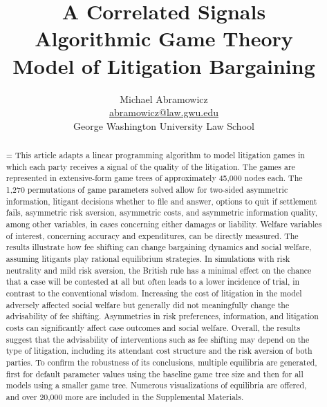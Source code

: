\documentclass{article}
\newenvironment{nohyphen}
  {\tolerance=1%
   \emergencystretch=\maxdimen%
   \hyphenpenalty=10000%
   \hbadness=10000}%
  {\par}%
\begin{document}
\title{A Correlated Signals \\ Algorithmic Game Theory \\ Model of Litigation Bargaining}
\author{Michael Abramowicz \\ \href{mailto:abramowicz@law.gwu.edu}{abramowicz@law.gwu.edu} \\ George Washington University Law School}

\maketitle

\begin{abstract}
\begin{nohyphen}
This article adapts a linear programming algorithm to model litigation games in which each party receives a signal of the quality of the litigation. The games are represented in extensive-form game trees of approximately 45,000 nodes each. The 1,270 permutations of game parameters solved allow for two-sided asymmetric information, litigant decisions whether to file and answer, options to quit if settlement fails, asymmetric risk aversion, asymmetric costs, and asymmetric information quality, among other variables, in cases concerning either damages or liability. Welfare variables of interest, concerning accuracy and expenditures, can be directly measured. The results illustrate how fee shifting can change bargaining dynamics and social welfare, assuming litigants play rational equilibrium strategies. In simulations with risk neutrality and mild risk aversion, the British rule has a minimal effect on the chance that a case will be contested at all but often leads to a lower incidence of trial, in contrast to the conventional wisdom. Increasing the cost of litigation in the model adversely affected social welfare but generally did not meaningfully change the advisability of fee shifting. Asymmetries in risk preferences, information, and litigation costs can significantly affect case outcomes and social welfare. Overall, the results suggest that the advisability of interventions such as fee shifting may depend on the type of litigation, including its attendant cost structure and the risk aversion of both parties. To confirm the robustness of its conclusions, multiple equilibria are generated, first for default parameter values using the baseline game tree size and then for all models using a smaller game tree. Numerous visualizations of equilibria are offered, and over 20,000 more are included in the Supplemental Materials. 
\end{nohyphen}
\end{abstract}
\end{document}
